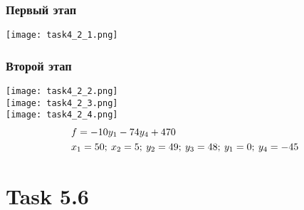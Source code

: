 \documentclass[12pt]{article}
\begin{document}
\subsubsection*{Первый этап}
\texttt{[image: task4\_2\_1.png]}\\
\subsubsection*{Второй этап}
\texttt{[image: task4\_2\_2.png]}\\
\texttt{[image: task4\_2\_3.png]}\\
\texttt{[image: task4\_2\_4.png]}\\
\begin{align}
  &f=-10y_1-74y_4+470\\
  &x_1=50;\:x_2=5;\:y_2=49;\:y_3=48;\:y_1=0;\:y_4=-45\notag
\end{align}
\section*{Task 5.6}
\end{document}
